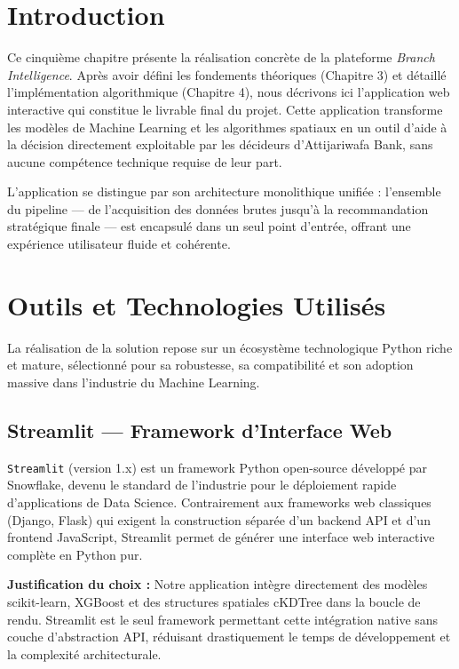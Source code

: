\documentclass[11pt,a4paper,twoside]{report}
\begin{document}
\section{Introduction}

Ce cinquième chapitre présente la réalisation concrète de la plateforme \textit{Branch Intelligence}. Après avoir défini les fondements théoriques (Chapitre 3) et détaillé l'implémentation algorithmique (Chapitre 4), nous décrivons ici l'application web interactive qui constitue le livrable final du projet. Cette application transforme les modèles de Machine Learning et les algorithmes spatiaux en un outil d'aide à la décision directement exploitable par les décideurs d'Attijariwafa Bank, sans aucune compétence technique requise de leur part.

L'application se distingue par son architecture monolithique unifiée : l'ensemble du pipeline --- de l'acquisition des données brutes jusqu'à la recommandation stratégique finale --- est encapsulé dans un seul point d'entrée, offrant une expérience utilisateur fluide et cohérente.

\section{Outils et Technologies Utilisés}

La réalisation de la solution repose sur un écosystème technologique Python riche et mature, sélectionné pour sa robustesse, sa compatibilité et son adoption massive dans l'industrie du Machine Learning.

\subsection{Streamlit — Framework d'Interface Web}

\texttt{Streamlit} \cite{streamlit} (version 1.x) est un framework Python open-source développé par Snowflake, devenu le standard de l'industrie pour le déploiement rapide d'applications de Data Science. Contrairement aux frameworks web classiques (Django, Flask) qui exigent la construction séparée d'un backend API et d'un frontend JavaScript, Streamlit permet de générer une interface web interactive complète en Python pur.

\textbf{Justification du choix :} Notre application intègre directement des modèles scikit-learn, XGBoost et des structures spatiales cKDTree dans la boucle de rendu. Streamlit est le seul framework permettant cette intégration native sans couche d'abstraction API, réduisant drastiquement le temps de développement et la complexité architecturale.
\end{document}
